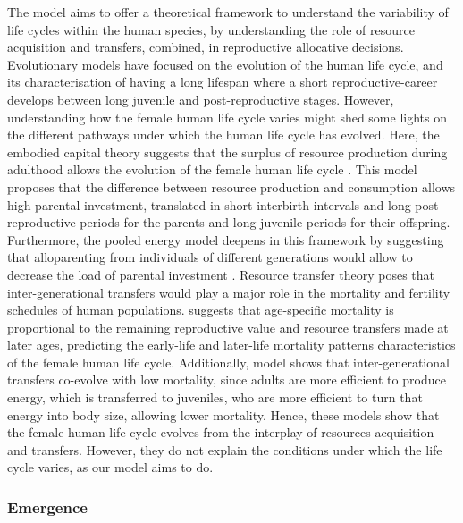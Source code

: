 \documentclass{article}
\begin{document}
The model aims to offer a theoretical framework to understand the variability of life cycles within the human species, by understanding the role of resource acquisition and transfers, combined, in reproductive allocative decisions. Evolutionary models have focused on the evolution of the human life cycle, and its characterisation of having a long lifespan where a short reproductive-career develops between long juvenile and post-reproductive stages. However, understanding how the female human life cycle varies might shed some lights on the different pathways under which the human life cycle has evolved. Here, the embodied capital theory suggests that the surplus of resource production during adulthood allows the evolution of the female human life cycle \citep{kaplan2000theory}. This model proposes that the difference between resource production and consumption allows high parental investment, translated in short interbirth intervals and long post-reproductive periods for the parents and long juvenile periods for their offspring. Furthermore, the pooled energy model deepens in this framework by suggesting that alloparenting from individuals of different generations would allow to decrease the load of parental investment \citep{kramer2010pooled}. Resource transfer theory poses that inter-generational transfers would play a major role in the mortality and fertility schedules of human populations. \cite{lee2003rethinking} suggests that age-specific mortality is proportional to the remaining reproductive value and resource transfers made at later ages, predicting the early-life and later-life mortality patterns characteristics of the female human life cycle. Additionally, \cite{chu2006co} model shows that inter-generational transfers co-evolve with low mortality, since adults are more efficient to produce energy, which is transferred to juveniles, who are more efficient to turn that energy into body size, allowing lower mortality. Hence, these models show that the female human life cycle evolves from the interplay of resources acquisition and transfers. However, they do not explain the conditions under which the life cycle varies, as our model aims to do.

\subsubsection{Emergence}
\end{document}
